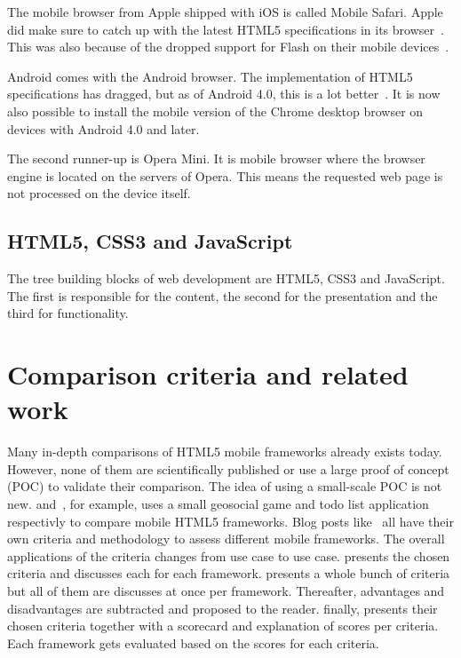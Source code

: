 \documentclass[a4paper]{artikel3}
\begin{document}
The mobile browser from Apple shipped with iOS is called Mobile Safari.
Apple did make sure to catch up with the latest HTML5 specifications in its browser~\cite{Hales2012}.
This was also because of the dropped support for Flash on their mobile devices~\cite{Jobs2010}.

Android comes with the Android browser.
The implementation of HTML5 specifications has dragged, but as of Android 4.0, this is a lot better~\cite{Hales2012}.
It is now also possible to install the mobile version of the Chrome desktop browser on devices with Android 4.0 and later.

The second runner-up is Opera Mini.
It is mobile browser where the browser engine is located on the servers of Opera.
This means the requested web page is not processed on the device itself.

\subsection{HTML5, CSS3 and JavaScript}
The tree building blocks of web development are HTML5, CSS3 and JavaScript.
The first is responsible for the content, the second for the presentation and the third for functionality.


\section{Comparison criteria and related work}
\label{sec:comparisoncriteria}


Many in-depth comparisons of HTML5 mobile frameworks already exists today.  
However, none of them are scientifically published or use a large proof of concept (POC) to validate their comparison.  
The idea of using a small-scale POC is not new.  
\cite{Oeflman2011} and~\cite{Kosmaczewski2012},  for example,  uses a small geosocial game and todo list application respectivly to compare mobile HTML5 frameworks.
Blog posts like~\cite{Sarrafi2012a,Ayuso2012,Rozynski2011} all have their own criteria and methodology to assess different mobile frameworks.  
The overall applications of the criteria changes from use case to use case.  
\cite{Rozynski2011} presents the chosen criteria and discusses each for each framework.  
\cite{Ayuso2012} presents a whole bunch of criteria but all of them are discusses at once per framework.  
Thereafter,  advantages and disadvantages are subtracted and proposed to the reader.  
\cite{Sarrafi2012a} finally,  presents their chosen criteria together with a scorecard and explanation of scores per criteria.  
Each framework gets evaluated based on the scores for each criteria.
\end{document}
